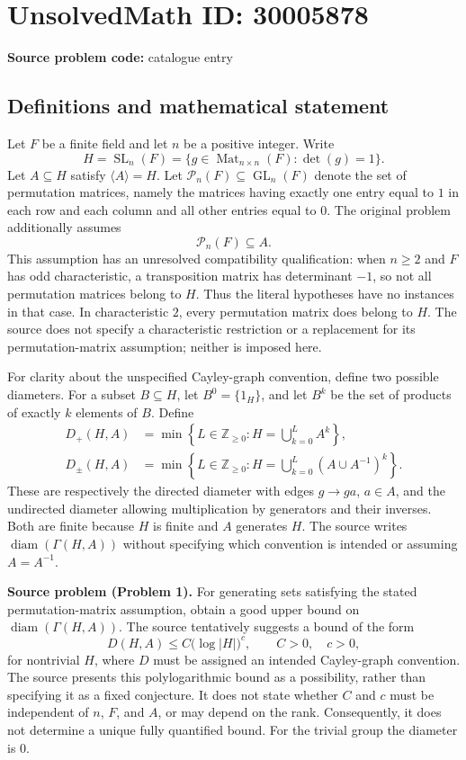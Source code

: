 \documentclass[11pt]{article}
\begin{document}
\section*{UnsolvedMath ID: 30005878}
\textbf{Source problem code:} catalogue entry
\subsection{Definitions and mathematical statement}
Let \(F\) be a finite field and let \(n\) be a positive integer. Write
\[
H=\operatorname{SL}_n(F)=\{g\in\operatorname{Mat}_{n\times n}(F):\det(g)=1\}.
\]
Let \(A\subseteq H\) satisfy \(\langle A\rangle=H\). Let \(\mathcal P_n(F)\subseteq\operatorname{GL}_n(F)\) denote the set of permutation matrices, namely the matrices having exactly one entry equal to \(1\) in each row and each column and all other entries equal to \(0\). The original problem additionally assumes
\[
\mathcal P_n(F)\subseteq A.
\]
This assumption has an unresolved compatibility qualification: when \(n\geq2\) and \(F\) has odd characteristic, a transposition matrix has determinant \(-1\), so not all permutation matrices belong to \(H\). Thus the literal hypotheses have no instances in that case. In characteristic \(2\), every permutation matrix does belong to \(H\). The source does not specify a characteristic restriction or a replacement for its permutation-matrix assumption; neither is imposed here.

For clarity about the unspecified Cayley-graph convention, define two possible diameters. For a subset \(B\subseteq H\), let \(B^0=\{1_H\}\), and let \(B^k\) be the set of products of exactly \(k\) elements of \(B\). Define
\[
\begin{aligned}
D_+(H,A)&=\min\left\{L\in\mathbb Z_{\geq0}:H=\bigcup_{k=0}^{L}A^k\right\},\\
D_{\pm}(H,A)&=\min\left\{L\in\mathbb Z_{\geq0}:H=\bigcup_{k=0}^{L}(A\cup A^{-1})^k\right\}.
\end{aligned}
\]
These are respectively the directed diameter with edges \(g\to ga\), \(a\in A\), and the undirected diameter allowing multiplication by generators and their inverses. Both are finite because \(H\) is finite and \(A\) generates \(H\). The source writes \(\operatorname{diam}(\Gamma(H,A))\) without specifying which convention is intended or assuming \(A=A^{-1}\).

\textbf{Source problem (Problem 1).} For generating sets satisfying the stated permutation-matrix assumption, obtain a good upper bound on \(\operatorname{diam}(\Gamma(H,A))\). The source tentatively suggests a bound of the form
\[
D(H,A)\leq C\bigl(\log|H|\bigr)^c,
\qquad C>0,\quad c>0,
\]
for nontrivial \(H\), where \(D\) must be assigned an intended Cayley-graph convention. The source presents this polylogarithmic bound as a possibility, rather than specifying it as a fixed conjecture. It does not state whether \(C\) and \(c\) must be independent of \(n\), \(F\), and \(A\), or may depend on the rank. Consequently, it does not determine a unique fully quantified bound. For the trivial group the diameter is \(0\).
\end{document}
